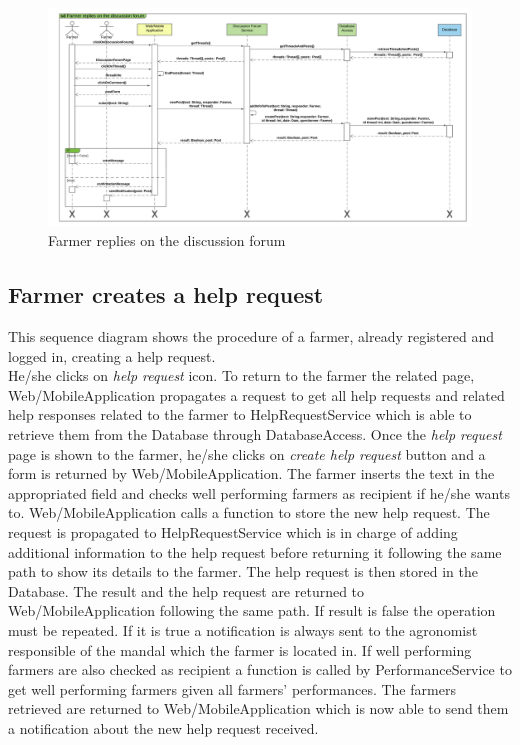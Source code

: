 \newpage
\begin{landscape}
\begin{figure}[h]
\vspace*{-2cm}
\noindent
\centering
\centerline{\includegraphics[scale= 0.108]{./Images/Sequence diagram/Farmer replies on the discussion forum.png}}
    \caption{Farmer replies on the discussion forum}
    \vspace*{-12cm}
\end{figure}
\fillandplacepagenumber
\end{landscape}

\subsection{Farmer creates a help request}

This sequence diagram shows the procedure of a farmer, already registered and logged in, creating a help request.\\
He/she clicks on \textit{help request} icon. To return to the farmer the related page, Web/MobileApplication propagates a request to get all help requests and related help responses related to the farmer to HelpRequestService which is able to retrieve them from the Database through DatabaseAccess. 
Once the \textit{help request} page is shown to the farmer, he/she clicks on \textit{create help request} button and a form is returned by Web/MobileApplication. The farmer inserts the text in the appropriated field and checks well performing farmers as recipient if he/she wants to. Web/MobileApplication calls a function to store the new help request. The request is propagated to HelpRequestService which is in charge of  adding additional information to the help request before returning it following the same path to show its details to the farmer. The help request is then stored in the Database. The result and the help request are returned to Web/MobileApplication following the same path. If result is false the operation must be repeated. If it is true a notification is always sent to the agronomist responsible of the mandal which the farmer is located in. If well performing farmers are also checked as recipient a function is called by PerformanceService to get well performing farmers given all farmers' performances. The farmers retrieved are returned to Web/MobileApplication which is now able to send them a notification about the new help request received. 

